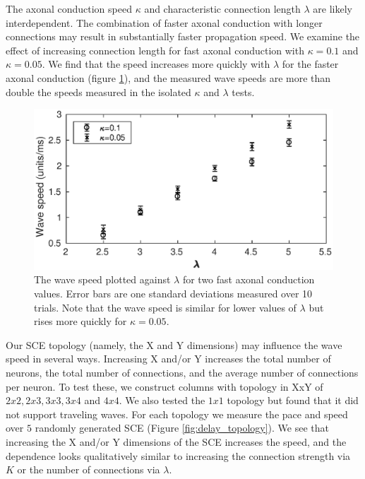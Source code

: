 The axonal conduction speed $\kappa$ and characteristic connection length $\lambda$ are likely interdependent.
The combination of faster axonal conduction with longer connections may result in substantially faster propagation speed.
We examine the effect of increasing connection length for fast axonal conduction with $\kappa=0.1$ and $\kappa=0.05$.
We find that the speed increases more quickly with $\lambda$ for the faster axonal conduction (figure \ref{fig:delay_kappalambda}), 
and the measured wave speeds are more than double the speeds measured in the isolated $\kappa$ and $\lambda$ tests. 
\begin{figure}[!htb]
 \centering
   \includegraphics[width=\textwidth]{fig/WaveSpeed_KappaLambda}
   \caption{ The wave speed plotted against $\lambda$ for two fast axonal conduction values.
	     Error bars are one standard deviations measured over 10 trials.
             Note that the wave speed is similar for lower values of $\lambda$ but rises more quickly for $\kappa=0.05$.}
   \label{fig:delay_kappalambda}
\end{figure}

\FloatBarrier

Our SCE topology (namely, the X and Y dimensions) may influence the wave speed in several ways.
Increasing X and/or Y increases the total number of neurons, the total number of connections, and the average number of connections per neuron.
To test these, we construct columns with topology in XxY of $2x2, 2x3, 3x3, 3x4$ and $4x4$.
We also tested the $1x1$ topology but found that it did not support traveling waves.
For each topology we measure the pace and speed over $5$ randomly generated SCE (Figure \ref{fig:delay_topology}).
We see that increasing the X and/or Y dimensions of the SCE increases the speed, and the dependence looks qualitatively similar to increasing the connection strength via $K$ or the number of connections via $\lambda$.

